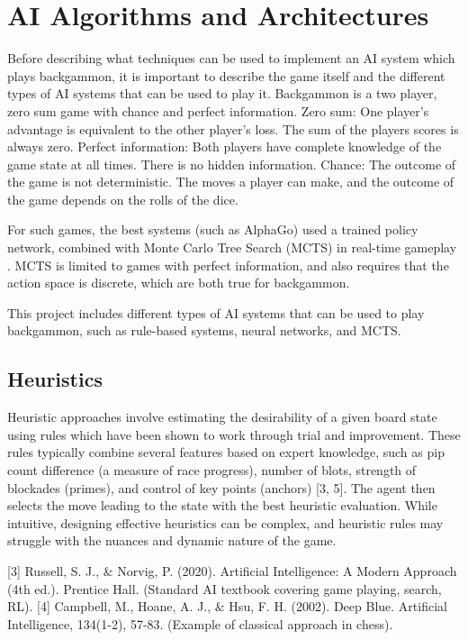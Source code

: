 \chapter{AI Algorithms and Architectures}
Before describing what techniques can be used to implement an AI system which plays backgammon, it is important to describe the game itself and the different types of AI systems that can be used to play it.
Backgammon is a two player, zero sum game with chance and perfect information.
Zero sum: One player's advantage is equivalent to the other player's loss. The sum of the players scores is always zero.
Perfect information: Both players have complete knowledge of the game state at all times. There is no hidden information.
Chance: The outcome of the game is not deterministic. The moves a player can make, and the outcome of the game depends on the rolls of the dice.

For such games, the best systems (such as AlphaGo) used a trained policy network, combined with Monte Carlo Tree Search (MCTS) in real-time gameplay \cite{aiparadigms}.
MCTS is limited to games with perfect information, and also requires that the action space is discrete, which are both true for backgammon.

This project includes different types of AI systems that can be used to play backgammon, such as rule-based systems, neural networks, and MCTS.

\section{Heuristics}
Heuristic approaches involve estimating the desirability of a given board state using rules which have been shown to work through trial and improvement. These rules typically combine several features based on expert knowledge, such as pip count difference (a measure of race progress), number of blots, strength of blockades (primes), and control of key points (anchors) [3, 5]. The agent then selects the move leading to the state with the best heuristic evaluation. While intuitive, designing effective heuristics can be complex, and heuristic rules may struggle with the nuances and dynamic nature of the game.

[3] Russell, S. J., \& Norvig, P. (2020). Artificial Intelligence: A Modern Approach (4th ed.). Prentice Hall. (Standard AI textbook covering game playing, search, RL).
[4] Campbell, M., Hoane, A. J., \& Hsu, F. H. (2002). Deep Blue. Artificial Intelligence, 134(1-2), 57-83. (Example of classical approach in chess).


